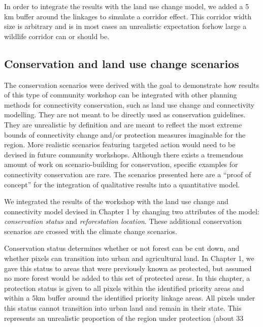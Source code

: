 In order to integrate the results with the land use change model, we added a 5 km buffer around the linkages to simulate a corridor effect. This corridor width size is arbitrary and is in most cases  an unrealistic expectation forhow large a wildlife corridor can or should be. \\

\subsection{Conservation and land use change scenarios}

The conservation scenarios were derived with the goal to demonstrate how results of this type of community workshop can be integrated with other planning methods for connectivity conservation, such as land use change and connectivity modelling. They are not meant to be directly used as conservation guidelines. They are unrealistic by definition and are meant to reflect the most extreme bounds of connectivity change and/or protection measures imaginable for the region. More realistic scenarios featuring targeted action would need to be devised in future community workshops. Although there exists a tremendous amount of work on scenario-building for conservation, specific examples for connectivity conservation are rare. The scenarios presented here are a “proof of concept” for the integration of qualitative results into a quantitative model. 

We integrated the results of the workshop with the land use change and connectivity model devised in Chapter 1 by changing two attributes of the model: \textit{conservation status} and \textit{reforestation location}. These additional conservation scenarios are crossed with the climate change scenarios.

Conservation status determines whether or not forest can be cut down, and whether pixels can transition into urban and agricultural land. In Chapter 1, we gave this status to areas that were previously known as protected, but assumed no more forest would be added to this set of protected areas. In this chapter, a protection status is given to all pixels within the identified priority areas and within a 5km buffer around the identified priority linkage areas. All pixels under this status cannot transition into urban land and remain in their state. This represents an unrealistic proportion of the region under protection (about 33%

